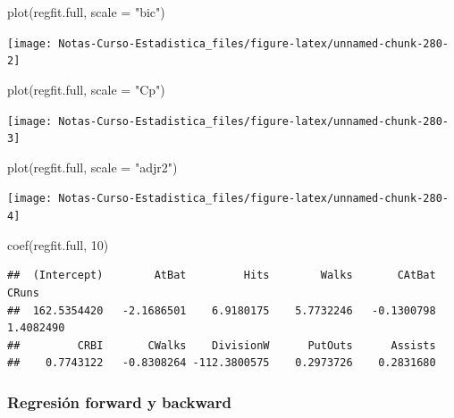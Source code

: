\documentclass[
  12pt,
]{book}
\newenvironment{Shaded}{\begin{snugshade}}{\end{snugshade}}
\newcommand{\AttributeTok}[1]{\textcolor[rgb]{0.77,0.63,0.00}{#1}}
\newcommand{\DecValTok}[1]{\textcolor[rgb]{0.00,0.00,0.81}{#1}}
\newcommand{\FunctionTok}[1]{\textcolor[rgb]{0.00,0.00,0.00}{#1}}
\newcommand{\NormalTok}[1]{#1}
\newcommand{\StringTok}[1]{\textcolor[rgb]{0.31,0.60,0.02}{#1}}
\theoremstyle{definition}
\theoremstyle{definition}
\theoremstyle{definition}
\theoremstyle{remark}
\begin{document}
\begin{Shaded}
\begin{Highlighting}[]
\FunctionTok{plot}\NormalTok{(regfit.full, }\AttributeTok{scale =} \StringTok{"bic"}\NormalTok{)}
\end{Highlighting}
\end{Shaded}

\begin{center}\texttt{[image: Notas-Curso-Estadistica\_files/figure-latex/unnamed-chunk-280-2]} \end{center}

\begin{Shaded}
\begin{Highlighting}[]
\FunctionTok{plot}\NormalTok{(regfit.full, }\AttributeTok{scale =} \StringTok{"Cp"}\NormalTok{)}
\end{Highlighting}
\end{Shaded}

\begin{center}\texttt{[image: Notas-Curso-Estadistica\_files/figure-latex/unnamed-chunk-280-3]} \end{center}

\begin{Shaded}
\begin{Highlighting}[]
\FunctionTok{plot}\NormalTok{(regfit.full, }\AttributeTok{scale =} \StringTok{"adjr2"}\NormalTok{)}
\end{Highlighting}
\end{Shaded}

\begin{center}\texttt{[image: Notas-Curso-Estadistica\_files/figure-latex/unnamed-chunk-280-4]} \end{center}

\begin{Shaded}
\begin{Highlighting}[]
\FunctionTok{coef}\NormalTok{(regfit.full, }\DecValTok{10}\NormalTok{)}
\end{Highlighting}
\end{Shaded}

\begin{verbatim}
##  (Intercept)        AtBat         Hits        Walks       CAtBat        CRuns 
##  162.5354420   -2.1686501    6.9180175    5.7732246   -0.1300798    1.4082490 
##         CRBI       CWalks    DivisionW      PutOuts      Assists 
##    0.7743122   -0.8308264 -112.3800575    0.2973726    0.2831680
\end{verbatim}

\hypertarget{regresiuxf3n-forward-y-backward}{%
\subsubsection{Regresión forward y backward}\label{regresiuxf3n-forward-y-backward}}
\end{document}
